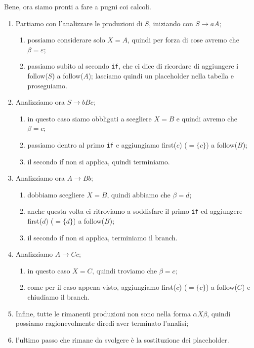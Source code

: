 \documentclass[class=book, crop=false, oneside, 12pt]{standalone}
\begin{document}
\noindent Bene, ora siamo pronti a fare a pugni coi calcoli.
\begin{enumerate}
    \item Partiamo con l’analizzare le produzioni di \(S\), iniziando con \(S \to aA\);
    \begin{enumerate}
        \item possiamo considerare solo \(X = A\), quindi per forza di cose avremo che \(\beta = \varepsilon\);
        \item passiamo subito al secondo \texttt{if}, che ci dice di ricordare di aggiungere i follow(\(S\)) a follow(\(A\)); lasciamo quindi un placeholder nella tabella e proseguiamo.
    \end{enumerate}
    \item Analizziamo ora \(S \to bBc\);
    \begin{enumerate}
        \item in questo caso siamo obbligati a scegliere \(X = B\) e quindi avremo che \(\beta = c\);
        \item passiamo dentro al primo \texttt{if} e aggiungiamo first(\(c\)) (\(=\{c\}\)) a follow(\(B\));
        \item il secondo if non si applica, quindi terminiamo.
    \end{enumerate}
    \item Analizziamo ora \(A \to Bb\);
    \begin{enumerate}
        \item dobbiamo scegliere \(X = B\), quindi abbiamo che \(\beta = d\);
        \item anche questa volta ci ritroviamo a soddisfare il primo \texttt{if} ed aggiungere first(\(d\)) (\(=\{d\}\)) a follow(\(B\));
        \item il secondo if non si applica, terminiamo il branch.
    \end{enumerate}
    \item Analizziamo \(A \to Cc\);
    \begin{enumerate}
        \item in questo caso \(X = C\), quindi troviamo che \(\beta = c\);
        \item come per il caso appena visto, aggiungiamo first(\(c\)) (\(=\{c\}\)) a follow(\(C\)) e chiudiamo il branch.
    \end{enumerate}
    \item Infine, tutte le rimanenti produzioni non sono nella forma \(\alpha X \beta\), quindi possiamo ragionevolmente diredi aver terminato l’analisi;
    \item l'ultimo passo che rimane da svolgere è la sostituzione dei placeholder.
\end{enumerate}
\end{document}
